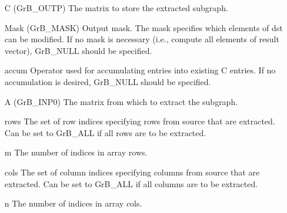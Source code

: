 \begin{itemize}[leftmargin=1in]
    \item[{\sf C}]   ({\sf GrB\_OUTP}) The matrix to store the extracted subgraph.

    \item[{\sf Mask}] ({\sf GrB\_MASK}) Output mask. The mask
    specifies which elements of {\sf dst} can be modified.
    If no mask is necessary (i.e., compute all elements of result
    vector), {\sf GrB\_NULL} should be specified.

    \item[{\sf accum}]  Operator used for accumulating entries into existing {\sf C} entries. 
			If no accumulation is desired, {\sf GrB\_NULL} should be specified.

    \item[{\sf A}]   ({\sf GrB\_INP0}) The matrix from which to extract the subgraph.
    \item[{\sf rows}]     The set of row indices specifying rows from source that
                              are extracted. Can
                              be set to {\sf GrB\_ALL} if all rows are
                              to be extracted.
    \item[{\sf m}]     The number of indices in array {\sf rows}.
    \item[{\sf cols}]   The set of column indices specifying
                              columns from source that are extracted. Can
                              be set to {\sf GrB\_ALL} if all columns are
                              to be extracted.
    \item[{\sf n}]     The number of indices in array {\sf cols}.


\end{itemize}
